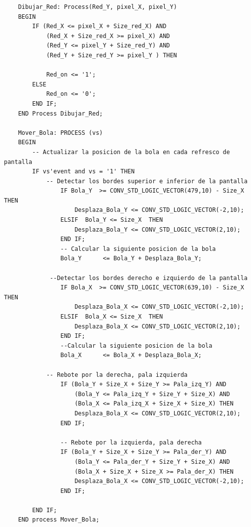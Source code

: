 \begin{lstlisting}
    Dibujar_Red: Process(Red_Y, pixel_X, pixel_Y)
    BEGIN
        IF (Red_X <= pixel_X + Size_red_X) AND
            (Red_X + Size_red_X >= pixel_X) AND
            (Red_Y <= pixel_Y + Size_red_Y) AND
            (Red_Y + Size_red_Y >= pixel_Y ) THEN
            
            Red_on <= '1';
        ELSE
            Red_on <= '0';
        END IF;
    END Process Dibujar_Red;
    
    Mover_Bola: PROCESS (vs)
    BEGIN
        -- Actualizar la posicion de la bola en cada refresco de pantalla
        IF vs'event and vs = '1' THEN
            -- Detectar los bordes superior e inferior de la pantalla
                IF Bola_Y  >= CONV_STD_LOGIC_VECTOR(479,10) - Size_X THEN
                    Desplaza_Bola_Y <= CONV_STD_LOGIC_VECTOR(-2,10);
                ELSIF  Bola_Y <= Size_X  THEN
                    Desplaza_Bola_Y <= CONV_STD_LOGIC_VECTOR(2,10);
                END IF;
                -- Calcular la siguiente posicion de la bola
                Bola_Y 	  	<= Bola_Y + Desplaza_Bola_Y;
                
             --Detectar los bordes derecho e izquierdo de la pantalla
                IF Bola_X  >= CONV_STD_LOGIC_VECTOR(639,10) - Size_X THEN	
                    Desplaza_Bola_X <= CONV_STD_LOGIC_VECTOR(-2,10);				
                ELSIF  Bola_X <= Size_X  THEN											
                    Desplaza_Bola_X <= CONV_STD_LOGIC_VECTOR(2,10);
                END IF;
                --Calcular la siguiente posicion de la bola
                Bola_X 	  	<= Bola_X + Desplaza_Bola_X;
                
            -- Rebote por la derecha, pala izquierda
                IF (Bola_Y + Size_X + Size_Y >= Pala_izq_Y) AND
                    (Bola_Y <= Pala_izq_Y + Size_Y + Size_X) AND
                    (Bola_X <= Pala_izq_X + Size_X + Size_X) THEN
                    Desplaza_Bola_X <= CONV_STD_LOGIC_VECTOR(2,10);
                END IF;
                
                -- Rebote por la izquierda, pala derecha			
                IF (Bola_Y + Size_X + Size_Y >= Pala_der_Y) AND
                    (Bola_Y <= Pala_der_Y + Size_Y + Size_X) AND
                    (Bola_X + Size_X + Size_X >= Pala_der_X) THEN
                    Desplaza_Bola_X <= CONV_STD_LOGIC_VECTOR(-2,10);
                END IF;
                
        END IF;
    END process Mover_Bola;
    

\end{lstlisting}
